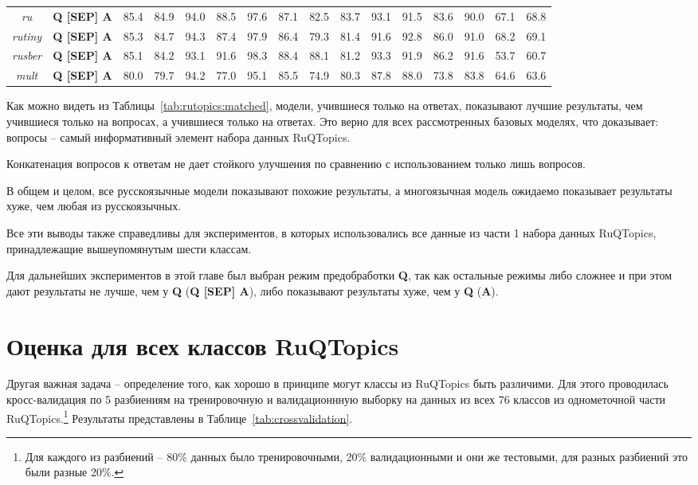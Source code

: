 \begin{table*}
{\begin{tabular}{|c|c||c|c|c|c|c|c|c|c|c|c|c|c|c|c|}
\textit{ru} &  \textbf{Q [SEP] A} & 85.4 & 84.9 & 94.0 & 88.5 & 97.6 & 87.1 & 82.5 & 83.7 & 93.1 & 91.5 & 83.6 & 90.0 & 67.1 & 68.8\\ %
\textit{rutiny} &  \textbf{Q [SEP] A} & 85.3 & 84.7 & 94.3 & 87.4 & 97.9 & 86.4 & 79.3 & 81.4 & 91.6 & 92.8 & 86.0 & 91.0 & 68.2 & 69.1\\ %
\textit{rusber} &  \textbf{Q [SEP] A} & 85.1 & 84.2 & 93.1 & 91.6 & 98.3 & 88.4 & 88.1 & 81.2 & 93.3 & 91.9 & 86.2 & 91.6 & 53.7 & 60.7\\ %
\textit{mult} &  \textbf{Q [SEP] A} & 80.0 & 79.7 & 94.2 & 77.0 & 95.1 & 85.5 & 74.9 & 80.3 & 87.8 & 88.0 & 73.8 & 83.8 & 64.6 & 63.6\\ \hline
\end{tabular}
}
\end{table*}

Как можно видеть из Таблицы~\ref{tab:rutopics:matched}, модели, учившиеся только на ответах, показывают лучшие результаты, чем учившиеся только на вопросах, а учившиеся только на ответах. Это верно для всех рассмотренных базовых моделях, что доказывает: вопросы -- самый информативный элемент набора данных {RuQTopics}. 

Конкатенация вопросов к ответам не дает стойкого улучшения по сравнению с использованием только лишь вопросов. 

В общем и целом, все русскоязычные модели показывают похожие результаты, а многоязычная модель ожидаемо показывает результаты хуже, чем любая из русскоязычных. 

Все эти выводы также справедливы для экспериментов, в которых использовались все данные из части 1 набора данных {RuQTopics}, принадлежащие вышеупомянутым шести классам.

Для дальнейших экспериментов в этой главе был выбран режим предобработки \textbf{Q}, так как остальные режимы либо сложнее и при этом дают результаты не лучше, чем у \textbf{Q} (\textbf{Q [SEP] A}), либо показывают результаты хуже, чем у \textbf{Q} (\textbf{A}).

\section{Оценка для всех классов {RuQTopics}}

Другая важная задача -- определение того, как хорошо в принципе могут классы из {RuQTopics} быть различими. Для этого проводилась кросс-валидация по 5 разбиениям на тренировочную и валидационнную выборку на данных из всех 76 классов из однометочной части {RuQTopics}.\footnote{Для каждого из разбиений -- 80\% данных было тренировочными, 20\% валидационными и они же тестовыми, для разных разбиений это были разные 20\%.} Результаты представлены в Таблице~\ref{tab:crossvalidation}.


